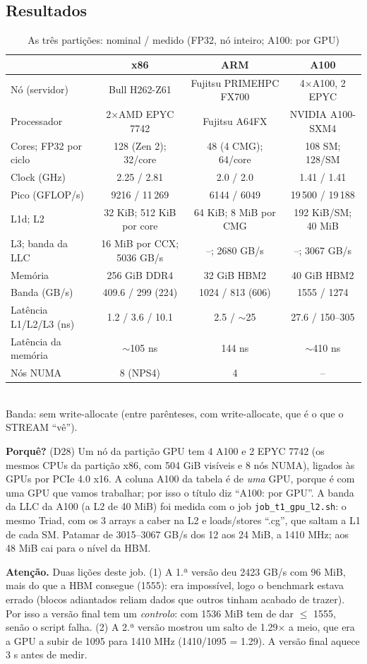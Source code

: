 \documentclass[11pt,a4paper]{article}
\newcommand{\porque}[1]{\par\noindent\colorbox{blue!6}{\parbox{\dimexpr\linewidth-2\fboxsep}{\small\textbf{Porquê?} #1}}\par}
\newcommand{\cuidado}[1]{\par\noindent\colorbox{orange!10}{\parbox{\dimexpr\linewidth-2\fboxsep}{\small\textbf{Atenção.} #1}}\par}
\begin{document}
\subsection{Resultados}
\begin{table}[H]\centering\small
\caption{As três partições: nominal / medido (FP32, nó inteiro; A100: por GPU)}
\setlength{\tabcolsep}{4pt}\footnotesize
\begin{tabular}{@{}lccc@{}}\toprule
 & \textbf{x86} & \textbf{ARM} & \textbf{A100} \\ \midrule
Nó (servidor) & Bull H262-Z61 & Fujitsu PRIMEHPC FX700 & 4$\times$A100, 2 EPYC \\
Processador & 2$\times$AMD EPYC 7742 & Fujitsu A64FX & NVIDIA A100-SXM4 \\
Cores; FP32 por ciclo & 128 (Zen 2); 32/core & 48 (4 CMG); 64/core & 108 SM; 128/SM \\
Clock (GHz) & 2.25 / 2.81 & 2.0 / 2.0 & 1.41 / 1.41 \\
Pico (GFLOP/s) & 9216 / 11\,269 & 6144 / 6049 & 19\,500 / 19\,188 \\
L1d; L2 & 32 KiB; 512 KiB por core & 64 KiB; 8 MiB por CMG & 192 KiB/SM; 40 MiB \\
L3; banda da LLC & 16 MiB por CCX; 5036 GB/s & --; 2680 GB/s & --; 3067 GB/s \\
Memória & 256 GiB DDR4 & 32 GiB HBM2 & 40 GiB HBM2 \\
Banda (GB/s) & 409.6 / 299 (224) & 1024 / 813 (606) & 1555 / 1274 \\
Latência L1/L2/L3 (ns) & 1.2 / 3.6 / 10.1 & 2.5 / $\sim$25 & 27.6 / 150--305 \\
Latência da memória & $\sim$105 ns & 144 ns & $\sim$410 ns \\
Nós NUMA & 8 (NPS4) & 4 & -- \\ \bottomrule
\end{tabular}\\[2pt]
\footnotesize Banda: sem write-allocate (entre parênteses, com write-allocate, que é o que o STREAM ``vê'').
\end{table}

\porque{(D28) Um nó da partição GPU tem 4 A100 e 2 EPYC 7742 (os mesmos CPUs da partição x86, com
504 GiB visíveis e 8 nós NUMA), ligados às GPUs por PCIe 4.0 x16. A coluna A100 da tabela é de
\emph{uma} GPU, porque é com uma GPU que vamos trabalhar; por isso o título diz ``A100: por GPU''. A
banda da LLC da A100 (a L2 de 40 MiB) foi medida com o job \texttt{job\_t1\_gpu\_l2.sh}: o mesmo Triad,
com os 3 arrays a caber na L2 e loads/stores ``.cg'', que saltam a L1 de cada SM. Patamar de
3015--3067 GB/s dos 12 aos 24 MiB, a 1410 MHz; aos 48 MiB cai para o nível da HBM.}
\cuidado{Duas lições deste job. (1) A 1.ª versão deu 2423 GB/s com 96 MiB, mais do que a HBM consegue
(1555): era impossível, logo o benchmark estava errado (blocos adiantados reliam dados que outros tinham
acabado de trazer). Por isso a versão final tem um \emph{controlo}: com 1536 MiB tem de dar $\le$ 1555,
senão o script falha. (2) A 2.ª versão mostrou um salto de 1.29$\times$ a meio, que era a GPU a subir de
1095 para 1410 MHz (1410/1095 = 1.29). A versão final aquece 3 s antes de medir.}
\end{document}
